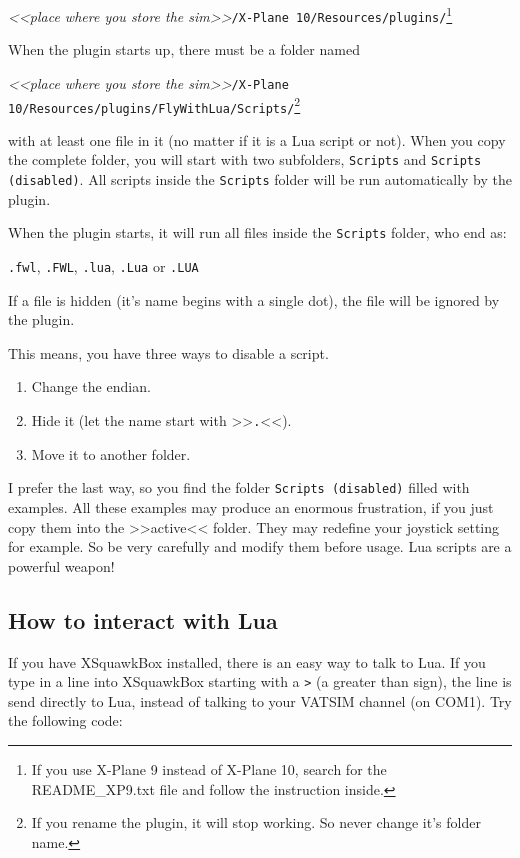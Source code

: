 \documentclass[11pt,parskip=half,a4paper]{scrartcl}
\begin{document}
\emph{<<place where you store the sim>>}\verb|/X-Plane 10/Resources/plugins/|\footnote{If you use X-Plane 9 instead of X-Plane 10, search for the README\_XP9.txt file and follow the instruction inside.}

When the plugin starts up, there must be a folder named

\emph{<<place where you store the sim>>}\verb|/X-Plane 10/Resources/plugins/FlyWithLua/Scripts/|\footnote{If you rename the plugin, it will stop working. So never change it's folder name.}

with at least one file in it (no matter if it is a Lua script or not). When you copy the complete folder, you will start with two subfolders, \verb|Scripts| and \verb|Scripts (disabled)|. All scripts inside the \verb|Scripts| folder will be run automatically by the plugin.

When the plugin starts, it will run all files inside the \verb|Scripts| folder, who end as:

\verb|.fwl|, \verb|.FWL|, \verb|.lua|, \verb|.Lua| or \verb|.LUA|

If a file is hidden (it's name begins with a single dot), the file will be ignored by the plugin.

This means, you have three ways to disable a script.

\begin{enumerate}
\item Change the endian.
\item Hide it (let the name start with >>\verb|.|<<).
\item Move it to another folder.
\end{enumerate}

I prefer the last way, so you find the folder \verb|Scripts (disabled)| filled with examples. All these examples may produce an enormous frustration, if you just copy them into the >>active<< folder. They may redefine your joystick setting for example. So be very carefully and modify them before usage. Lua scripts are a powerful weapon!

\subsection{How to interact with Lua}

If you have XSquawkBox installed, there is an easy way to talk to Lua. If you type in a line into XSquawkBox starting with a \verb|>| (a greater than sign), the line is send directly to Lua, instead of talking to your VATSIM channel (on COM1). Try the following code:
\end{document}
